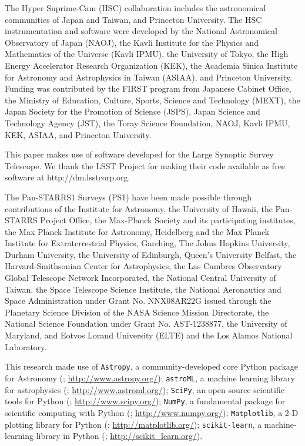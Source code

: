 \documentclass[useamsfonts]{pasj01}
\begin{document}
\begin{ack}
    \label{sec:ack}

    The Hyper Suprime-Cam (HSC) collaboration includes the astronomical communities of
    Japan and Taiwan, and Princeton University.
    The HSC instrumentation and software were developed by the National Astronomical
    Observatory of Japan (NAOJ), the Kavli Institute for the Physics and Mathematics of
    the Universe (Kavli IPMU), the University of Tokyo, the High Energy Accelerator
    Research Organization (KEK), the Academia Sinica Institute for Astronomy and
    Astrophysics in Taiwan (ASIAA), and Princeton University.
    Funding was contributed by the FIRST program from Japanese Cabinet Office, the
    Ministry of Education, Culture, Sports, Science and Technology (MEXT), the Japan
    Society for the Promotion of Science (JSPS), Japan Science and Technology Agency
    (JST), the Toray Science  Foundation, NAOJ, Kavli IPMU, KEK, ASIAA, and Princeton
    University.

    This paper makes use of software developed for the Large Synoptic Survey Telescope.
    We thank the LSST Project for making their code available as free software at
    http://dm.lsstcorp.org.

    The Pan-STARRS1 Surveys (PS1) have been made possible through contributions of the
    Institute for Astronomy, the University of Hawaii, the Pan-STARRS Project Office,
    the Max-Planck Society and its participating institutes, the Max Planck Institute
    for Astronomy, Heidelberg and the Max Planck Institute for Extraterrestrial Physics,
    Garching, The Johns Hopkins University, Durham University, the University of
    Edinburgh, Queen's University Belfast, the Harvard-Smithsonian Center for Astrophysics,
    the Las Cumbres Observatory Global Telescope Network Incorporated, the National
    Central University of Taiwan, the Space Telescope Science Institute, the National
    Aeronautics and Space Administration under Grant No.
    NNX08AR22G issued through the Planetary Science Division of the NASA Science
    Mission Directorate, the National Science Foundation under Grant No. AST-1238877,
    the University of Maryland, and Eotvos Lorand University (ELTE) and the Los Alamos
    National Laboratory.

    This research made use of
    {\texttt{Astropy}},
        a community-developed core Python package for Astronomy (\citealt{Astropy};
        \url{http://www.astropy.org/});
    {\texttt{astroML}},
        a machine learning library for astrophysics (\citealt{astroml};
        \url{http://www.astroml.org/});
    {\texttt{SciPy}},
        an open source scientific tools for Python (\citealt{SciPy};
        \url{http://www.scipy.org/});
    {\texttt{NumPy}},
        a fundamental package for scientific computing with Python (\citealt{NumPy};
        \url{http://www.numpy.org/});
    {\texttt{Matplotlib}},
        a 2-D plotting library for Python (\citealt{Matplotlib};
        \url{http://matplotlib.org/});
    {\texttt{scikit-learn}},
        a machine-learning library in Python (\citealt{scikit-learn};
        \url{http://scikit_learn.org/}).

\end{ack}
\end{document}
